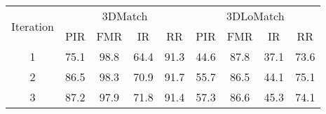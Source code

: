 \begin{table}[h]
	\renewcommand{\arraystretch}{1}
    \centering
    \label{tab:ablation_iteration}
    \wuhao
    \begin{tabular}{ccccccccc}
    \toprule[1.5pt]
    \multicolumn{1}{l}{\multirow{2}{*}{Iteration}} 
    & \multicolumn{4}{c}{3DMatch}
    & \multicolumn{4}{c}{3DLoMatch} \\
    \multicolumn{1}{l}{}
    &{PIR} &{FMR} &{IR} &{RR}   
    &{PIR} &{FMR} &{IR} &{RR}    \\ \hline
    1
    & 75.1  & 98.8  & 64.4  & 91.3 & 44.6  & 87.8  & 37.1  & 73.6  \\
    2
    & 86.5  & 98.3  & 70.9  & 91.7 & 55.7  & 86.5  & 44.1  & 75.1  \\
    3
    & 87.2  & 97.9  & 71.8  & 91.4 & 57.3  & 86.6  & 45.3  & 74.1  \\
    \bottomrule[1.5pt]
    \end{tabular}
\end{table}